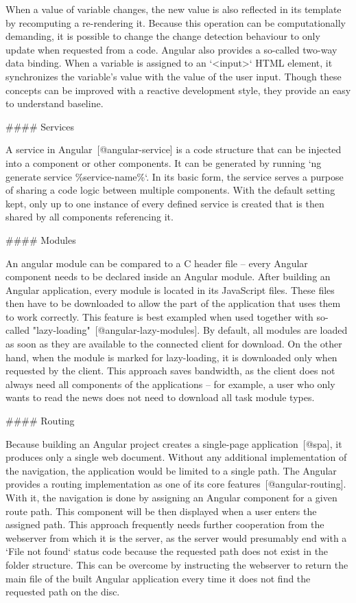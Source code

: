 \documentclass[
  digital, %
  oneside, %
  lof,     %
  nolot,     %
]{fithesis4}
\begin{document}
When a value of variable changes, the new value is also reflected in its template by recomputing a re-rendering it. Because this operation can be computationally demanding, it is possible to change the change detection behaviour to only update when requested from a code. Angular also provides a so-called two-way data binding. When a variable is assigned to an `<input>` HTML element, it synchronizes the variable's value with the value of the user input. Though these concepts can be improved with a reactive development style, they provide an easy to understand baseline.

#### Services

A service in Angular~[@angular-service] is a code structure that can be injected into a component or other components. It can be generated by running `ng generate service \%service-name\%`. In its basic form, the service serves a purpose of sharing a code logic between multiple components. With the default setting kept, only up to one instance of every defined service is created that is then shared by all components referencing it.

#### Modules

An angular module can be compared to a C header file -- every Angular component needs to be declared inside an Angular module. After building an Angular application, every module is located in its JavaScript files. These files then have to be downloaded to allow the part of the application that uses them to work correctly. This feature is best exampled when used together with so-called "lazy-loading"~[@angular-lazy-modules]. By default, all modules are loaded as soon as they are available to the connected client for download. On the other hand, when the module is marked for lazy-loading, it is downloaded only when requested by the client. This approach saves bandwidth, as the client does not always need all components of the applications -- for example, a user who only wants to read the news does not need to download all task module types.


#### Routing

Because building an Angular project creates a single-page application~[@spa], it produces only a single web document. Without any additional implementation of the navigation, the application would be limited to a single path. The Angular provides a routing implementation as one of its core features~[@angular-routing]. With it, the navigation is done by assigning an Angular component for a given route path. This component will be then displayed when a user enters the assigned path. This approach frequently needs further cooperation from the webserver from which it is the server, as the server would presumably end with a `File not found` status code because the requested path does not exist in the folder structure. This can be overcome by instructing the webserver to return the main file of the built Angular application every time it does not find the requested path on the disc.
\end{document}
